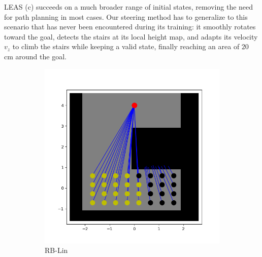 LEAS (c) succeeds on a much broader range of initial states, removing the need for path planning in most cases. Our steering method has to generalize to this scenario that has never been encountered during its training: it smoothly rotates toward the goal, detects the stairs at its local height map, and adapts its velocity $v_z$ to climb the stairs while keeping a valid state, finally reaching an area of $20$ cm around the goal.

\begin{figure}
    \centering
    \captionsetup[subfigure]{justification=centering}
    \begin{subfigure}[t]{0.49\linewidth}
    \includegraphics[width=\textwidth]{Figures/Chapter_LEAS/hole_p1_lin.png}
    \caption{RB-Lin}
    \end{subfigure}
    \begin{subfigure}[t]{0.49\linewidth}

\end{subfigure}
\end{figure}
